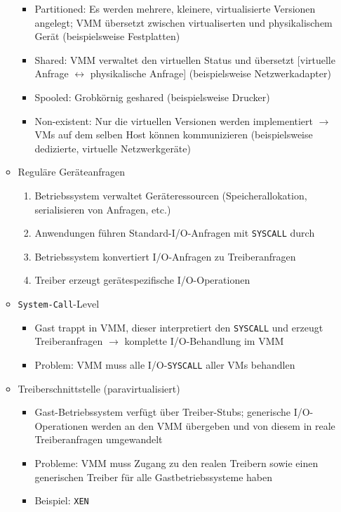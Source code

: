 \begin{itemize}
\begin{itemize}
\begin{itemize}
			\item Partitioned: Es werden mehrere, kleinere, virtualisierte Versionen angelegt; VMM übersetzt zwischen virtualiserten und physikalischem Gerät (beispielsweise Festplatten)
			\item Shared: VMM verwaltet den virtuellen Status und übersetzt [virtuelle Anfrage \(\leftrightarrow\) physikalische Anfrage] (beispielsweise Netzwerkadapter)
			\item Spooled: Grobkörnig geshared (beispielsweise Drucker)
			\item Non-existent: Nur die virtuellen Versionen werden implementiert \(\rightarrow\) VMs auf dem selben Host können kommunizieren (beispielsweise dedizierte, virtuelle Netzwerkgeräte)
		\end{itemize}
		\item Reguläre Geräteanfragen
		\begin{enumerate}
			\item Betriebssystem verwaltet Geräteressourcen (Speicherallokation, serialisieren von Anfragen, etc.)
			\item Anwendungen führen Standard-I/O-Anfragen mit \texttt{SYSCALL} durch
			\item Betriebssystem konvertiert I/O-Anfragen zu Treiberanfragen
			\item Treiber erzeugt gerätespezifische I/O-Operationen
		\end{enumerate}
		\item \texttt{System-Call}-Level
		\begin{itemize}
			\item Gast trappt in VMM, dieser interpretiert den \texttt{SYSCALL} und erzeugt Treiberanfragen \(\rightarrow\) komplette I/O-Behandlung im VMM
			\item Problem: VMM muss alle I/O-\texttt{SYSCALL} aller VMs behandlen
		\end{itemize}
		\item Treiberschnittstelle (paravirtualisiert)
		\begin{itemize}
			\item Gast-Betriebssystem verfügt über Treiber-Stubs; generische I/O-Operationen werden an den VMM übergeben und von diesem in reale Treiberanfragen umgewandelt
			\item Probleme: VMM muss Zugang zu den realen Treibern sowie einen generischen Treiber für alle Gastbetriebssysteme haben
			\item Beispiel: \texttt{XEN}
		\end{itemize}
	\end{itemize}
\end{itemize}

